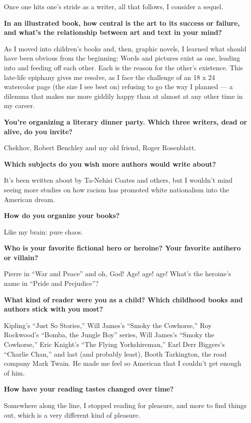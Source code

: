Once one hits one's stride as a writer, all that follows, I consider a
sequel.

\textbf{In an illustrated book, how central is the art to its success or
failure, and what's the relationship between art and text in your mind?}

As I moved into children's books and, then, graphic novels, I learned
what should have been obvious from the beginning: Words and pictures
exist as one, leading into and feeding off each other. Each is the
reason for the other's existence. This late-life epiphany gives me
resolve, as I face the challenge of an 18 x 24 watercolor page (the size
I see best on) refusing to go the way I planned --- a dilemma that makes
me more giddily happy than at almost at any other time in my career.

\textbf{You're organizing a literary dinner party. Which three writers,
dead or alive, do you invite?}

Chekhov, Robert Benchley and my old friend, Roger Rosenblatt.

\textbf{Which subjects do you wish more authors would write about?}

It's been written about by Ta-Nehisi Coates and others, but I wouldn't
mind seeing more studies on how racism has promoted white nationalism
into the American dream.

\textbf{How do you organize your books?}

Like my brain: pure chaos.

\textbf{Who is your favorite fictional hero or heroine? Your favorite
antihero or villain?}

Pierre in ``War and Peace'' and oh, God! Age! age! age! What's the
heroine's name in ``Pride and Prejudice''?

\textbf{What kind of reader were you as a child? Which childhood books
and authors stick with you most?}

Kipling's ``Just So Stories,'' Will James's ``Smoky the Cowhorse,'' Roy
Rockwood's ``Bomba, the Jungle Boy'' series, Will James's ``Smoky the
Cowhorse,'' Eric Knight's ``The Flying Yorkshireman,'' Earl Derr
Biggers's ``Charlie Chan,'' and last (and probably least), Booth
Tarkington, the road company Mark Twain. He made me feel so American
that I couldn't get enough of him.

\textbf{How have your reading tastes changed over time?}

Somewhere along the line, I stopped reading for pleasure, and more to
find things out, which is a very different kind of pleasure.

